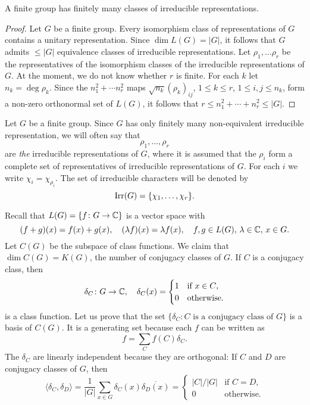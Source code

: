 
\begin{corollary}
     A finite group has finitely many classes of irreducible representations. 
\end{corollary}

\begin{proof}
     Let $G$ be a finite group. 
     Every isomorphism class of representations of $G$ contains a unitary representation. 
     Since $\dim L(G)=|G|$, 
     it follows that $G$ admits $\leq|G|$ equivalence classes of irreducible representations. Let
     $\rho_1,\dots\rho_r$ be the representatives of the isomorphism classes of the 
    irreducible representations of $G$. At the moment, we do not know whether $r$ is finite. 
    For each $k$ let $n_k=\deg\rho_k$. Since
     the $n_1^2+\cdots n_r^2$ maps $\sqrt{n_k}(\rho_k)_{ij}$, $1\leq k\leq r$, $1\leq i,j\leq n_k$,
     form a non-zero orthonormal set of $L(G)$, it follows that
     $r\leq n_1^2+\cdots+ n_r^2\leq|G|$.
\end{proof}

Let $G$ be a finite group. Since $G$ has only finitely many non-equivalent 
irreducible representation, we will often say
that 
\[
\rho_1,\dots,\rho_r
\]
are \emph{the} irreducible representations of $G$, where it is assumed that
the $\rho_i$ form a complete set of 
representatives of irreducible representations of $G$. For each $i$ we write
$\chi_i=\chi_{\rho_i}$. The set of irreducible characters will be denoted
by 
\[
\operatorname{Irr}(G)=\{\chi_1,\dots,\chi_r\}.
\]


Recall that $L(G)=\{f\colon G\to\mathbb{C}\}$ is a vector space with
\[
    (f+g)(x)=f(x)+g(x),
    \quad
    (\lambda f)(x)=\lambda f(x),
    \quad 
    f,g\in L(G),\,\lambda\in\mathbb{C},\,x\in G.
\]
Let $C(G)$ be the subspace of class functions. 
We claim that $\dim C(G)=K(G)$, the number of conjugacy classes of $G$. If $C$ is a conjugacy class, 
then 
\[
\delta_C\colon G\to\mathbb{C},\quad
\delta_C(x)=\begin{cases}
    1 & \text{if $x\in C$,}\\
    0 & \text{otherwise.}
\end{cases}
\]
is a class function. Let us prove that the 
set $\{\delta_C:C\text{ is a conjugacy class of $G$}\}$ is a basis of $C(G)$.  It is a generating set
because each $f$ can be written as 
\[
f=\sum_{C}f(C)\delta_C.
\]
The $\delta_C$ are linearly independent because they are orthogonal: 
If $C$ and $D$ 
are conjugacy classes of $G$, then 
\[
\langle\delta_C,\delta_D\rangle=\frac{1}{|G|}\sum_{x\in G}\delta_C(x)\overline{\delta_D(x)}
=\begin{cases}
|C|/|G| & \text{if $C=D$},\\
0 & \text{otherwise}.
\end{cases}
\]

